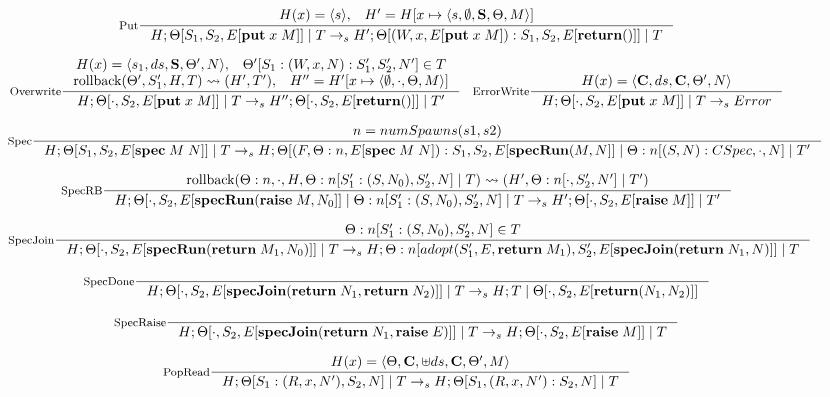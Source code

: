 \begin{figure*}
\[%
\inference[\text{Put}]{H(x) = \langle s \rangle, \;\;\; H' = H[x \mapsto \langle s, \emptyset, \spec, \Theta, M\rangle]}{H; \Theta[S_1, S_2, \eval{\putKW \; x \; M}] \; | \; T \specStep H'; \Theta[(W, x, \eval{\putKW \; x \; M}) : S_1, S_2, \eval{\return()}] \; | \; T}
\]

\[%
\inference[\text{Overwrite}]{H(x) = \langle s_1, ds, \spec, \Theta', N\rangle, \;\;\; \Theta'[S_1 : (W, x, N) : S_1', S_2', N'] \in T \\
 \rollback(\Theta', S_1', H, T) \leadsto (H', T'), \;\;\; H'' = H'[x\mapsto\langle \emptyset, \cdot, \Theta, M\rangle]}{H; \Theta[\cdot, S_2, \eval{\putKW \; x \; M}] \; | \; T \specStep H''; \Theta[\cdot, S_2, \eval{\return ()}] \; | \; T'} \;\;\;
\inference[\text{ErrorWrite}]{H(x) = \langle \commit, ds, \commit, \Theta', N\rangle}{H; \Theta[\cdot, S_2, \eval{\putKW \; x \; M}] \; | \; T \specStep Error}
\]

\[%
\inference[\text{Spec}]{n = numSpawns(s1, s2)}{H; \Theta[S_1, S_2, \eval{\specKW \; M \; N}] \; | \; T \specStep H; \Theta[(F, \Theta:n, \eval{\specKW \; M \; N}) : S_1, S_2, \eval{\specRunKW(M, N}] \; | \; \Theta:n[(S, N) : CSpec, \cdot, N] \; | \; T'}
\]

\[%
\inference[\text{SpecRB}]{\rollback(\Theta:n, \cdot, H,\Theta:n[S_1' : (S, N_0), S_2', N] \; | \; T) \leadsto (H', \Theta:n[\cdot, S_2', N'] \; | \; T')}{H; \Theta[\cdot, S_2, \eval{\specRunKW(\raiseKW \; M, N_0}] \; | \; \Theta:n[S_1':(S, N_0), S_2', N] \; | \; T \specStep H'; \Theta[\cdot, S_2, \eval{\raiseKW \; M}] \; | \; T'}
\]

\[%
\inference[\text{SpecJoin}]{\Theta:n[S_1' : (S, N_0), S_2', N] \in T}{H; \Theta[\cdot, S_2, \eval{\specRunKW(\return \; M_1, N_0)}] \; | \; T \specStep H; \Theta:n[adopt(S_1', E, \return \; M_1), S_2', \eval{\specJoinKW(\return \; N_1, N)}] \; | \; T}
\]

\[%
\inference[\text{SpecDone}]{}{H; \Theta[\cdot, S_2, \eval{\specJoinKW(\return \; N_1, \return \; N_2)}] \; | \; T \specStep H; T \; | \; \Theta[\cdot, S_2, \eval{\return(N_1, N_2)}]}
\]

\[%
\inference[\text{SpecRaise}]{}{H; \Theta[\cdot, S_2, \eval{\specJoinKW(\return \; N_1, \raiseKW \; E)}] \; | \;  T \specStep H; \Theta[\cdot, S_2, \eval{\raiseKW \; M}] \; | \; T} 
\]

\[%
\inference[\text{PopRead}]{H(x) = \langle \Theta, \commit, \uplus ds, \commit, \Theta', M\rangle}{H; \Theta[S_1 : (R, x, N'), S_2, N] \; | \; T \specStep H; \Theta[S_1, (R, x, N'): S_2, N] \; | \; T}
\]


\end{figure*}
